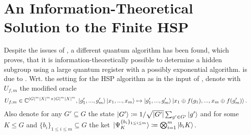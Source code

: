 \documentclass[10pt]{amsart}
\theoremstyle{definition}
\theoremstyle{remark}
\begin{document}

    \section{An Information-Theoretical Solution to the Finite HSP} \phantom{}

    Despite the issues of , a different quantum algorithm has been found, which proves, that it is information-theoretically possible to determine a hidden subgroup using a large quantum register with a possibly exponential algorithm.  is due to \cite[pp. 2-3]{Ettinger1999a}. Wrt. the setting for the HSP algorithm as in the input of , denote with \(U_{f, m}\) the modified oracle
    \begin{align}
        U_{f, m} \in \mathbb{C}^{|G|^m|X|^m \times |G|^m|X|^m}, \ket{g'_1, ..., g'_m}\ket{x_1, ..., x_m} \mapsto \ket{g'_1, ..., g'_m}\ket{x_1 \oplus f(g_1), ..., x_m \oplus f(g'_m)}.
    \end{align}
    Also denote for any \(G' \subseteq G\) the state \(\ket{G'} \coloneqq 1/\sqrt{|G'|}\sum_{g' \in G'} \ket{g'}\) and for some \(K \leq G\) and \(\{b_i\}_{1 \leq i \leq m} \subseteq G\) the ket \(\ket*{\Psi_K^{\{b_i\}_{1 \leq i \leq m}}} \coloneqq \bigotimes_{i=1}^m \ket{b_iK}\).
\end{document}
